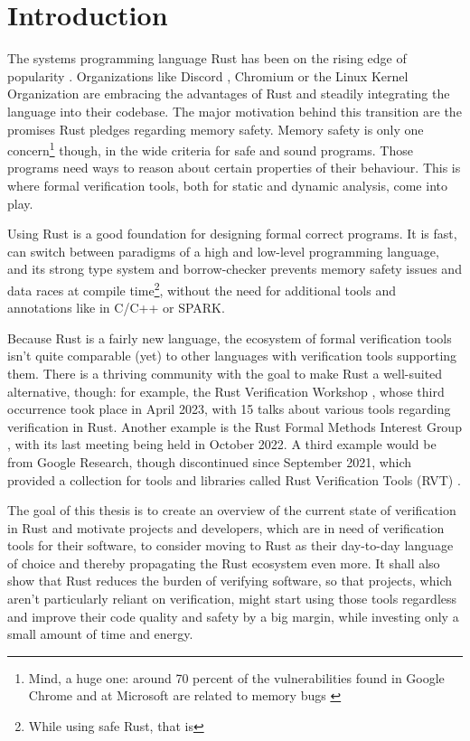 \section{Introduction}

The systems programming language Rust has been on the rising edge of popularity \cite{stack_overflow_stack_2022}. Organizations like Discord \cite{jesse_howarth_why_2020}, Chromium \cite{dana_jansens_supporting_2023} or the Linux Kernel Organization \cite{noauthor_rust_nodate} are embracing the advantages of Rust and steadily integrating the language into their codebase.
The major motivation behind this transition are the promises Rust pledges regarding memory safety.
Memory safety is only one concern\footnote{Mind, a huge one: around 70 percent of the vulnerabilities found in Google Chrome and at Microsoft are related to memory bugs \cite{national_security_agency_software_2022}} though, in the wide criteria for safe and sound programs.
Those programs need ways to reason about certain properties of their behaviour.
This is where formal verification tools, both for static and dynamic analysis, come into play.

Using Rust is a good foundation for designing formal correct programs.
It is fast, can switch between paradigms of a high and low-level programming language, and its strong type system and borrow-checker prevents memory safety issues and data races at compile time\footnote{While using safe Rust, that is}, without the need for additional tools and annotations like in C/C++ or SPARK.

Because Rust is a fairly new language, the ecosystem of formal verification tools isn't quite comparable (yet) to other languages with verification tools supporting them. There is a thriving community with the goal to make Rust a well-suited alternative, though:
for example, the Rust Verification Workshop \cite{peter_muller_rust_2023}, whose third occurrence took place in April 2023, with 15 talks about various tools regarding verification in Rust. Another example is the Rust Formal Methods Interest Group \cite{rust_formal_methods_interest_group_welcome_2021}, with its last meeting being held in October 2022. A third example would be from Google Research, though discontinued since September 2021, which provided a collection for tools and libraries called Rust Verification Tools (RVT) \cite{research_rust_2021}.

The goal of this thesis is to create an overview of the current state of verification in Rust and motivate projects and developers, which are in need of verification tools for their software, to consider moving to Rust as their day-to-day language of choice and thereby propagating the Rust ecosystem even more. It shall also show that Rust reduces the burden of verifying software, so that projects, which aren't particularly reliant on verification, might start using those tools regardless and improve their code quality and safety by a big margin, while investing only a small amount of time and energy.

